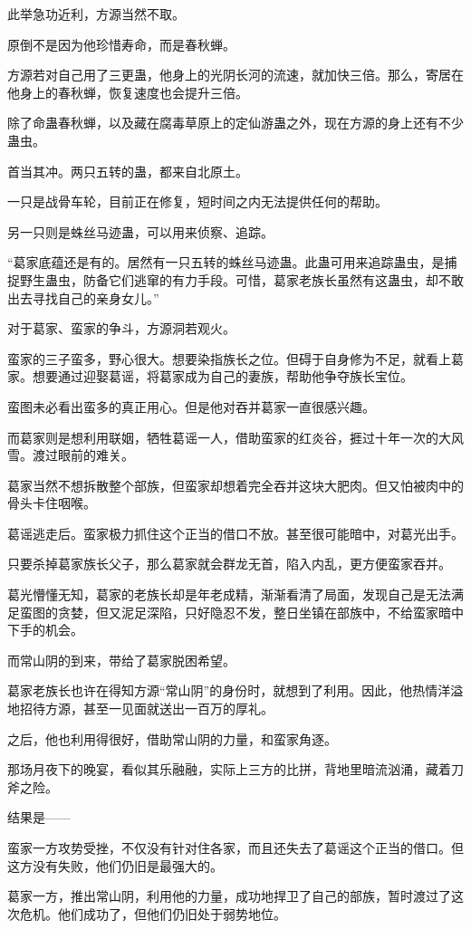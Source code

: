 \begin{this_body}
此举急功近利，方源当然不取。

原倒不是因为他珍惜寿命，而是春秋蝉。

方源若对自己用了三更蛊，他身上的光阴长河的流速，就加快三倍。那么，寄居在他身上的春秋蝉，恢复速度也会提升三倍。

除了命蛊春秋蝉，以及藏在腐毒草原上的定仙游蛊之外，现在方源的身上还有不少蛊虫。

首当其冲。两只五转的蛊，都来自北原土。

一只是战骨车轮，目前正在修复，短时间之内无法提供任何的帮助。

另一只则是蛛丝马迹蛊，可以用来侦察、追踪。

“葛家底蕴还是有的。居然有一只五转的蛛丝马迹蛊。此蛊可用来追踪蛊虫，是捕捉野生蛊虫，防备它们逃窜的有力手段。可惜，葛家老族长虽然有这蛊虫，却不敢出去寻找自己的亲身女儿。”

对于葛家、蛮家的争斗，方源洞若观火。

蛮家的三子蛮多，野心很大。想要染指族长之位。但碍于自身修为不足，就看上葛家。想要通过迎娶葛谣，将葛家成为自己的妻族，帮助他争夺族长宝位。

蛮图未必看出蛮多的真正用心。但是他对吞并葛家一直很感兴趣。

而葛家则是想利用联姻，牺牲葛谣一人，借助蛮家的红炎谷，捱过十年一次的大风雪。渡过眼前的难关。

葛家当然不想拆散整个部族，但蛮家却想着完全吞并这块大肥肉。但又怕被肉中的骨头卡住咽喉。

葛谣逃走后。蛮家极力抓住这个正当的借口不放。甚至很可能暗中，对葛光出手。

只要杀掉葛家族长父子，那么葛家就会群龙无首，陷入内乱，更方便蛮家吞并。

葛光懵懂无知，葛家的老族长却是年老成精，渐渐看清了局面，发现自己是无法满足蛮图的贪婪，但又泥足深陷，只好隐忍不发，整日坐镇在部族中，不给蛮家暗中下手的机会。

而常山阴的到来，带给了葛家脱困希望。

葛家老族长也许在得知方源“常山阴”的身份时，就想到了利用。因此，他热情洋溢地招待方源，甚至一见面就送出一百万的厚礼。

之后，他也利用得很好，借助常山阴的力量，和蛮家角逐。

那场月夜下的晚宴，看似其乐融融，实际上三方的比拼，背地里暗流汹涌，藏着刀斧之险。

结果是——

蛮家一方攻势受挫，不仅没有针对住各家，而且还失去了葛谣这个正当的借口。但这方没有失败，他们仍旧是最强大的。

葛家一方，推出常山阴，利用他的力量，成功地捍卫了自己的部族，暂时渡过了这次危机。他们成功了，但他们仍旧处于弱势地位。


\end{this_body}
